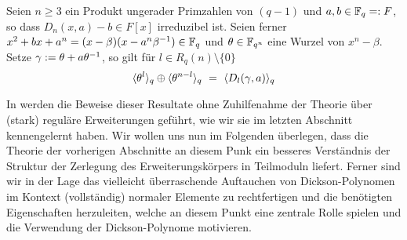 \begin{satz}[{\autocite[Theorem 3]{scheerhorn:1997}}] 
  \label{satz:scheerhorn2}
  Seien $n\geq 3$ ein Produkt ungerader Primzahlen von $(q-1)$ und
  $a,b \in \mathbb{F}_q =: F$, so dass $D_n(x,a)-b\in F[x]$ irreduzibel ist.
  Seien ferner $x^2+bx +a^n = (x-\beta)(x-a^n\beta^{-1}) \in \mathbb{F}_q$ und
  $\theta \in \mathbb{F}_{q^n}$ eine Wurzel von $x^n-\beta$. Setze 
  $\gamma := \theta + a\theta^{-1}$, so gilt für 
  $l\in R_q(n) \setminus\{0\}$
  \[ \langle \theta^l\rangle_q \oplus \langle \theta^{n-l}\rangle_q
  \ =\  \langle D_l(\gamma,a)\rangle_q\]
\end{satz}

In \autocites{scheerhorn:1996}{scheerhorn:1997} werden die Beweise dieser
Resultate ohne Zuhilfenahme der Theorie über (stark) reguläre
Erweiterungen geführt, wie wir sie im letzten Abschnitt kennengelernt haben.
Wir wollen uns nun im Folgenden überlegen, dass die Theorie der vorherigen
Abschnitte an diesem Punk ein besseres Verständnis der Struktur der Zerlegung 
des Erweiterungskörpers in Teilmoduln liefert. Ferner sind wir in der Lage
das vielleicht überraschende Auftauchen von Dickson-Polynomen im Kontext
(vollständig) normaler Elemente zu rechtfertigen und die benötigten 
Eigenschaften herzuleiten, welche an diesem Punkt eine zentrale Rolle spielen
und die Verwendung der Dickson-Polynome motivieren.

